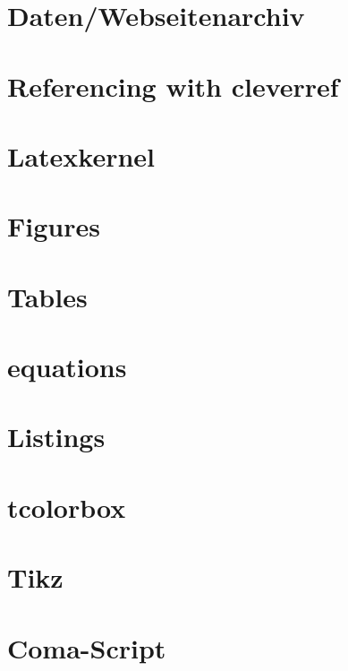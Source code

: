 \documentclass[final]{berichtclass}         %
\begin{document}
\pagestyle{scrheadings}

\tableofcontents
\clearpage

\section{Daten/Webseitenarchiv}

\newpage

\section{Referencing with cleverref}\label{chapter}

\newpage

\section{Latexkernel}

\clearpage

\section{Figures}

\newpage

\section{Tables}

\clearpage

\section{equations}

\newpage

\section{Listings}

\clearpage

\section{tcolorbox}

\clearpage

\section{Tikz}

\clearpage

\section{Coma-Script}

\clearpage

\begingroup
\hypersetup{urlcolor=.}                     %
\printbibliography[heading=bibintoc,title={Literaturquellen},filter={literature}]
\printbibliography[heading=bibintoc,title={Abbildungsquellen},filter={figures}]
\endgroup
\clearpage
\appendix
\end{document}

